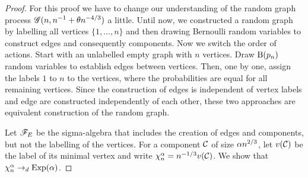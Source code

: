\begin{proof}
	For this proof we have to change our understanding of the random graph process $\mathscr{G}(n, n^{-1} + \theta n^{-4/3})$ a little.
	Until now, we constructed a random graph by labelling all vertices $\{1, \dots, n\}$ 
	and then drawing Bernoulli random variables to construct edges and consequently components.
	Now we switch the order of actions. 
	Start with an unlabelled empty graph with $n$ vertices.
	Draw $\operatorname*{B}(p_n)$ random variables to establish edges between vertices.
	Then, one by one, assign the labels $1$ to $n$ to the vertices,
	where the probabilities are equal for all remaining vertices.
	Since the construction of edges is independent of vertex labels and edge are constructed independently of each other,
	these two approaches are equivalent construction of the random graph.
	
	Let $\mathscr{F}_E$ be the sigma-algebra that includes the creation of edges and components, 
	but not the labelling of the vertices.
	For a component $\mathcal{C}$ of size $\alpha n^{2 / 3}$,
	let $v(\mathcal{C})$ be the label of its minimal vertex and write 
	$\chi^\alpha_n = n^{-1 / 3}v(\mathcal{C})$.
	We show that $\chi^\alpha_n \rightarrow_d \operatorname*{Exp}(\alpha)$.
	

\end{proof}
